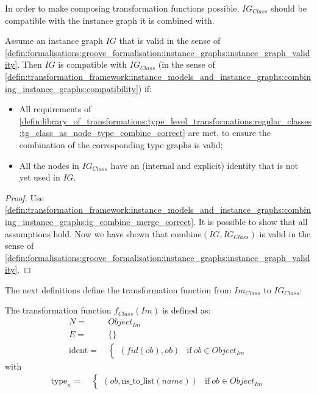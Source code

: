 In order to make composing transformation functions possible, $IG_{Class}$ should be compatible with the instance graph it is combined with.

\begin{thm}
\label{defin:library_of_transformations:instance_level_transformations:plain_objects:ig_class_as_node_type_combine_correct}
Assume an instance graph $IG$ that is valid in the sense of \cref{defin:formalisations:groove_formalisation:instance_graphs:instance_graph_validity}. Then $IG$ is compatible with $IG_{Class}$ (in the sense of \cref{defin:transformation_framework:instance_models_and_instance_graphs:combining_instance_graphs:compatibility}) if:
\begin{itemize}
    \item All requirements of \cref{defin:library_of_transformations:type_level_transformations:regular_classes:tg_class_as_node_type_combine_correct} are met, to ensure the combination of the corresponding type graphs is valid;
    \item All the nodes in $IG_{Class}$ have an (internal and explicit) identity that is not yet used in $IG$.
\end{itemize}
\end{thm}

\begin{proof}
Use \cref{defin:transformation_framework:instance_models_and_instance_graphs:combining_instance_graphs:ig_combine_merge_correct}. It is possible to show that all assumptions hold. Now we have shown that $\mathrm{combine}(IG, IG_{Class})$ is valid in the sense of \cref{defin:formalisations:groove_formalisation:instance_graphs:instance_graph_validity}.
\end{proof}

The next definitions define the transformation function from $Im_{Class}$ to $IG_{Class}$:

\begin{defin}
\label{defin:library_of_transformations:instance_level_transformations:plain_objects:imod_class_to_ig_class_as_node_type}
The transformation function $f_{Class}(Im)$ is defined as:
\begin{align*}
N =\ & Object_{Im} \\
E =\ & \{\} \\
\mathrm{ident} =\ & \begin{cases}
    (fid(ob), ob) & \mathrm{if }\ ob \in Object_{Im}
\end{cases}
\end{align*}
with
\begin{align*}
\mathrm{type}_n =\ & \begin{cases}
    (ob, \mathrm{ns\_\!to\_\!list}(name)) & \mathrm{if }\ ob \in Object_{Im}
\end{cases}
\end{align*}
\end{defin}

